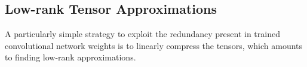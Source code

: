 
\subsection{Low-rank Tensor Approximations}\label{subsec:low_rank}

A particularly simple strategy to exploit the redundancy present in trained convolutional network weights is to 
linearly compress the tensors, which amounts to finding low-rank approximations. 

